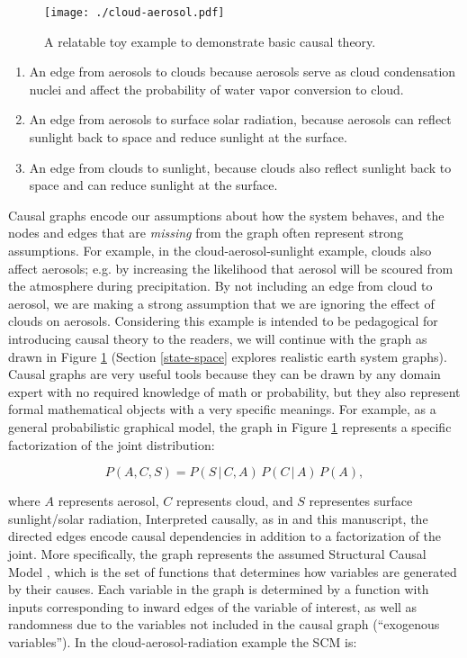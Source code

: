 \documentclass[12pt]{article}
\begin{document}
\begin{figure}
  \texttt{[image: ./cloud-aerosol.pdf]}\\
  \caption{A relatable toy example to demonstrate basic causal theory.}
  \label{fig:toy}
\end{figure}

\begin{enumerate}
\item An edge from aerosols to clouds because aerosols serve as cloud
  condensation nuclei and affect the probability of water vapor
  conversion to cloud.
\item An edge from aerosols to surface solar radiation, because
  aerosols can reflect sunlight back to space and reduce sunlight
  at the surface.
\item An edge from clouds to sunlight, because clouds also reflect
  sunlight back to space and can reduce sunlight at the surface.
\end{enumerate}

Causal graphs encode our assumptions about how the system behaves, and
the nodes and edges that are \textit{missing} from the graph often
represent strong assumptions. For example, in the
cloud-aerosol-sunlight example, clouds also affect aerosols; e.g. by
increasing the likelihood that aerosol will be scoured from the
atmosphere during precipitation. By not including an edge from cloud
to aerosol, we are making a strong assumption that we are ignoring the
effect of clouds on aerosols. Considering this example is intended to
be pedagogical for introducing causal theory to the readers, we will
continue with the graph as drawn in Figure \ref{fig:toy} (Section
\ref{state-space} explores realistic earth system graphs). Causal
graphs are very useful tools because they can be drawn by any domain
expert with no required knowledge of math or probability, but they
also represent formal mathematical objects with a very specific
meanings. For example, as a general probabilistic graphical model, the
graph in Figure \ref{fig:toy} represents a specific factorization of
the joint distribution:

\begin{equation}
  P(A, C, S) = P(S \, | \,C, A) \, P(C \, | \, A) \, P(A),
\end{equation}

where $A$ represents aerosol, $C$ represents cloud, and $S$
representes surface sunlight/solar radiation, Interpreted causally, as
in \citet{pearl1995causal} and this manuscript, the directed edges
encode causal dependencies in addition to a factorization of the
joint. More specifically, the graph represents the assumed Structural
Causal Model \citep[SCM,][]{pearl2009}, which is the set of functions
that determines how variables are generated by their causes. Each
variable in the graph is determined by a function with inputs
corresponding to inward edges of the variable of interest, as well as
randomness due to the variables not included in the causal graph
(``exogenous variables'').  In the cloud-aerosol-radiation example the
SCM is:
\end{document}

